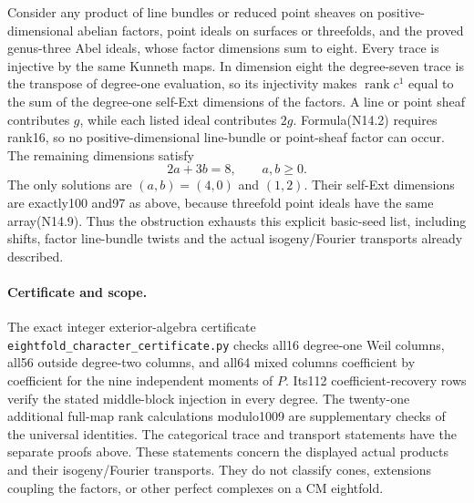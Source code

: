 Consider any product of line bundles or reduced point sheaves
on positive-dimensional abelian factors, point ideals on
surfaces or threefolds, and the proved genus-three Abel ideals,
whose factor dimensions sum to eight. Every trace is injective
by the same Kunneth maps. In dimension eight the degree-seven
trace is the transpose of degree-one evaluation, so its
injectivity makes $\operatorname{rank}c^1$ equal to
the sum of the degree-one self-Ext dimensions of the factors.
A line or point sheaf contributes $g$, while each listed
ideal contributes $2g$. Formula(N14.2) requires rank16,
so no positive-dimensional line-bundle or point-sheaf factor
can occur. The remaining dimensions satisfy
\[
 2a+3b=8,\qquad a,b\ge0.
\]
The only solutions are $(a,b)=(4,0)$ and $(1,2)$.
Their self-Ext dimensions are exactly100 and97 as above,
because threefold point ideals have the same array(N14.9).
Thus the obstruction exhausts this explicit basic-seed list,
including shifts, factor line-bundle twists and the actual
isogeny/Fourier transports already described.

\paragraph{Certificate and scope.}
The exact integer exterior-algebra certificate
\nolinkurl{eightfold_character_certificate.py} checks all16
degree-one Weil columns, all56 outside degree-two columns,
and all64 mixed columns coefficient by coefficient for the
nine independent moments of $P$. Its112 coefficient-recovery
rows verify the stated middle-block injection in every degree.
The twenty-one additional full-map rank calculations modulo1009
are supplementary checks of the universal identities.
The categorical trace and transport statements have the
separate proofs above. These statements concern the displayed
actual products and their isogeny/Fourier transports. They do
not classify cones, extensions coupling the factors, or other
perfect complexes on a CM eightfold.
